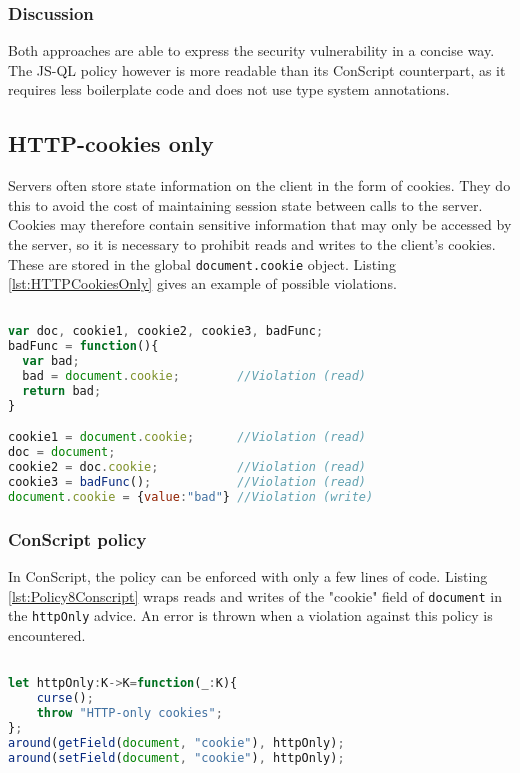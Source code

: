 \subsubsection*{Discussion}
Both approaches are able to express the security vulnerability in a concise way. The JS-QL policy however is more readable than its ConScript counterpart, as it requires less boilerplate code and does not use type system annotations.

\subsection{HTTP-cookies only}
\label{subsec:HTTPOnly}


Servers often store state information on the client in the form of cookies. They do this to avoid the cost of maintaining session state between calls to the server. Cookies may therefore contain sensitive information that may only be accessed by the server, so it is necessary to prohibit reads and writes to the client's cookies. These are stored in the global \texttt{document.cookie} object. Listing \ref{lst:HTTPCookiesOnly} gives an example of possible violations.

\begin{lstlisting}[label={lst:HTTPCookiesOnly},language=JavaScript,caption=HTTP-cookies only example,mathescape=true]  % float=t?

var doc, cookie1, cookie2, cookie3, badFunc;
badFunc = function(){
  var bad;
  bad = document.cookie;        //Violation (read)
  return bad;
}

cookie1 = document.cookie;      //Violation (read)
doc = document;
cookie2 = doc.cookie;           //Violation (read)
cookie3 = badFunc();            //Violation (read)
document.cookie = {value:"bad"} //Violation (write)
\end{lstlisting}


\subsubsection*{ConScript policy}

In ConScript, the policy can be enforced with only a few lines of code. Listing \ref{lst:Policy8Conscript} wraps reads and writes of the "cookie" field of \texttt{document} in the \texttt{httpOnly} advice. An error is thrown when a violation against this policy is encountered.

\begin{lstlisting}[label={lst:Policy8Conscript},language=JavaScript,caption=Policy 8 in ConScript,mathescape=true]  % float=t?

let httpOnly:K->K=function(_:K){ 
    curse(); 
    throw "HTTP-only cookies"; 
};
around(getField(document, "cookie"), httpOnly); 
around(setField(document, "cookie"), httpOnly);
\end{lstlisting}


